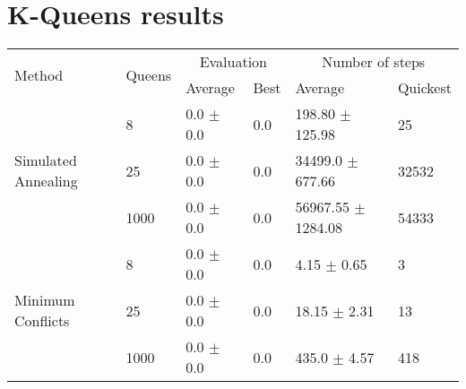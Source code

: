 \section{K-Queens results}


\begin{table*}\centering
    \caption{}
    \label{tab:kqueens}
	\vspace{2mm}
	\begin{tabular}{llllll}
		\toprule[2.0px]
			\multirow{2}{*}{Method} & 
			\multirow{2}{*}{Queens} & 
			\multicolumn{2}{c}{Evaluation} 	& 
			\multicolumn{2}{c}{Number of steps}\\
			   &          & Average & Best & Average & Quickest \\ 
		\midrule
		\multirow{3}{*}{Simulated Annealing} 
			& 8  & 0.0 $\pm$ 0.0 & 0.0 & 198.80 $\pm$ 125.98 & 25\\ %
			& 25 & 0.0 $\pm$ 0.0 & 0.0 & 34499.0 $\pm$ 677.66 & 32532 \\ %
			& 1000 &  0.0 $\pm$ 0.0 & 0.0 & 56967.55 $\pm$ 1284.08 & 54333\\ %
		\multirow{3}{*}{Minimum Conflicts}
			& 8  & 0.0 $\pm$ 0.0 & 0.0 & 4.15 $\pm$ 0.65 & 3\\ %
			& 25 & 0.0 $\pm$ 0.0 & 0.0 & 18.15 $\pm$ 2.31 & 13\\ %
			& 1000 & 0.0 $\pm$ 0.0 & 0.0 & 435.0 $\pm$ 4.57 & 418\\ %
		\bottomrule[2.0px]
	\end{tabular}
\end{table*}